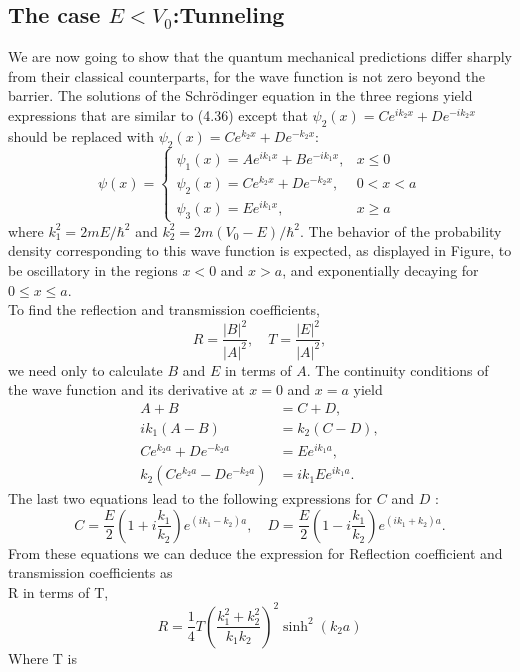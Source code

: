 \subsection{The case $E<V_0$:Tunneling}
We are now going to show that the quantum mechanical predictions differ sharply from their classical counterparts, for the wave function is not zero beyond the barrier. The solutions of the Schrödinger equation in the three regions yield expressions that are similar to (4.36) except that $\psi_{2}(x)=C e^{i k_{2} x}+D e^{-i k_{2} x}$ should be replaced with $\psi_{2}(x)=C e^{k_{2} x}+D e^{-k_{2} x}:$\\
$$\psi(x)= \begin{cases}\psi_{1}(x)=A e^{i k_{1} x}+B e^{-i k_{1} x}, & x \leq 0 \\ \psi_{2}(x)=C e^{k_{2} x}+D e^{-k_{2} x}, & 0<x<a \\ \psi_{3}(x)=E e^{i k_{1} x}, & x \geq a\end{cases}$$
where $k_{1}^{2}=2 m E / \hbar^{2}$ and $k_{2}^{2}=2 m\left(V_{0}-E\right) / \hbar^{2}$. The behavior of the probability density corresponding to this wave function is expected, as displayed in Figure, to be oscillatory in the regions $x<0$ and $x>a$, and exponentially decaying for $0 \leq x \leq a$.\\
To find the reflection and transmission coefficients,
$$
R=\frac{|B|^{2}}{|A|^{2}}, \quad T=\frac{|E|^{2}}{|A|^{2}},
$$
we need only to calculate $B$ and $E$ in terms of $A$. The continuity conditions of the wave function and its derivative at $x=0$ and $x=a$ yield
$$\begin{aligned}
	A+B &=C+D, \\
	i k_{1}(A-B) &=k_{2}(C-D), \\
	C e^{k_{2} a}+D e^{-k_{2} a} &=E e^{i k_{1} a}, \\
	k_{2}\left(C e^{k_{2} a}-D e^{-k_{2} a}\right) &=i k_{1} E e^{i k_{1} a} .
\end{aligned}$$
The last two equations lead to the following expressions for $C$ and $D$ :
$$
C=\frac{E}{2}\left(1+i \frac{k_{1}}{k_{2}}\right) e^{\left(i k_{1}-k_{2}\right) a}, \quad D=\frac{E}{2}\left(1-i \frac{k_{1}}{k_{2}}\right) e^{\left(i k_{1}+k_{2}\right) a} .
$$
From these equations we can deduce the expression for Reflection coefficient and transmission coefficients as\\
R in terms of T,\\
$$R=\frac{1}{4} T\left(\frac{k_{1}^{2}+k_{2}^{2}}{k_{1} k_{2}}\right)^{2} \sinh ^{2}\left(k_{2} a\right) $$
Where T is \\
